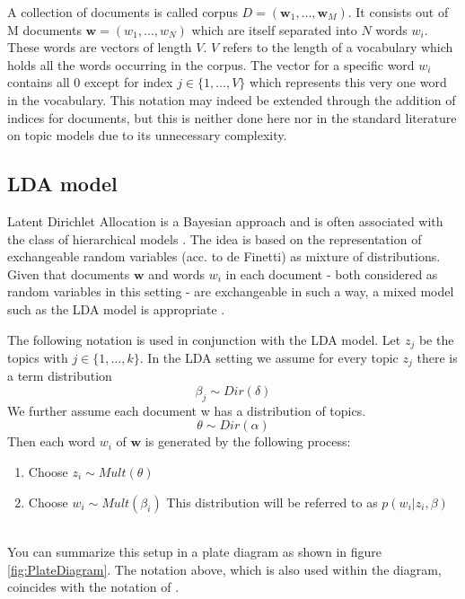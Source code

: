 \documentclass[11pt,a4paper]{article}
\begin{document}
A collection of documents is called corpus $D=(\textbf{w}_1,\dots , \textbf{w}_M)$. It consists out of M documents $\textbf{w}=(w_1,\dots, w_N)$ which are itself separated into $N$ words $w_i$. These words are vectors of length $V$. $V$ refers to the length of a vocabulary which holds all the words occurring in the corpus. The vector for a specific word $w_i$ contains all 0 except for index $j\in\{1,...,V\}$ which represents this very one word in the vocabulary.
This notation may indeed be extended through the addition of indices for documents, but this is neither done here nor in the standard literature on topic models due to its unnecessary complexity.


\subsection{LDA model}\label{sec:LDA}

Latent Dirichlet Allocation is a Bayesian approach and is often associated with the class of hierarchical models \cite{Gelman2014}. The idea is based on the representation of exchangeable random variables (acc. to de Finetti) as 
mixture of distributions. Given that documents $\textbf{w}$ and words $w_i$ in each document - both considered as random variables in this setting - are exchangeable in such a way, a mixed model such as the LDA model is appropriate \cite{Blei2003}.

The following notation is used in conjunction with the LDA model. Let $z_j$ be the topics with $j\in\{1,\dots,k\}$. In the LDA setting we assume for  every topic $z_j$ there is a term distribution
$$\beta_j \sim Dir(\delta)$$
We further assume each document w has a distribution of topics.
$$\theta \sim Dir(\alpha)$$
Then each word $w_i$ of $\textbf{w}$ is generated by the following process:

\begin{enumerate}
	\item Choose $z_i \sim Mult(\theta)$
	
	\item Choose $w_i \sim Mult(\beta_i)$ This distribution will be referred to as $p(w_i|z_i,\beta)$
\end{enumerate}
\ \\
You can summarize this setup in a plate diagram as shown in figure \ref{fig:PlateDiagram}. The notation above, which is also used within the diagram, coincides with the notation of \cite{Hornik2011}.\\
\end{document}
